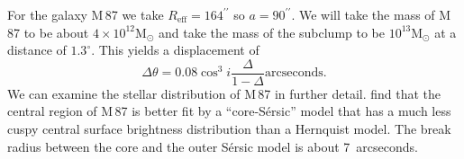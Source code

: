 \documentclass[useAMS,usenatbib]{mn2e}
\newcommand{\msun}{\mathrm{M}_\odot}
\begin{document}
For the galaxy M\,87 we take $R_\mathrm{eff}=164^{\prime\prime}$
\citep{2006ApJS..164..334F} so $a=90^{\prime\prime}$.  We will take
the mass of M\,87 to be about $4\times 10^{12} \msun$
\citep{2006ApJ...643..210W} and take the mass of the subclump to be
$10^{13} \msun$ at a distance of $1.3^\circ$. This yields a
displacement of
\begin{equation}
  \Delta \theta = 0.08 \cos^3 i \frac{\Delta}{1-\Delta} 
  \mathrm{arcseconds}.
  \label{eq:16}
\end{equation}
We can examine the stellar distribution of M\,87 in further detail.
\citet{2006ApJS..164..334F} find that the central region of M\,87 is
better fit by a ``core-S\'ersic'' model
\citep{1968adga.book.....S,2004AJ....127.1917T} that has a much less
cuspy central surface brightness distribution than a Hernquist model.
The break radius between the core and the outer S\'ersic model is
about 7~arcseconds.

\end{document}
